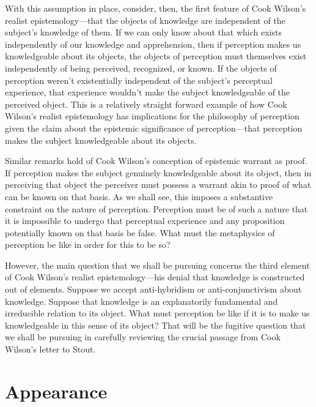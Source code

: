 \documentclass[12pt]{article}
\begin{document}
With this assumption in place, consider, then, the first feature of Cook Wilson's realist epistemology---that the objects of knowledge are independent of the subject's knowledge of them. If we can only know about that which exists independently of our knowledge and apprehension, then if perception makes us knowledgeable about its objects, the objects of perception must themselves exist independently of being perceived, recognized, or known. If the objects of perception weren't existentially independent of the subject's perceptual experience, that experience wouldn't make the subject knowledgeable of the perceived object. This is a relatively straight forward example of how Cook Wilson's realist epistemology has implications for the philosophy of perception given the claim about the epistemic significance of perception---that perception makes the subject knowledgeable about its objects.

Similar remarks hold of Cook Wilson's conception of epistemic warrant as proof. If perception makes the subject genuinely knowledgeable about its object, then in perceiving that object the perceiver must possess a warrant akin to proof of what can be known on that basis. As we shall see, this imposes a substantive constraint on the nature of perception. Perception must be of such a nature that it is impossible to undergo that perceptual experience and any proposition potentially known on that basis be false. What must the metaphysics of perception be like in order for this to be so?

However, the main question that we shall be pursuing concerns the third element of Cook Wilson's realist epistemology---his denial that knowledge is constructed out of elements. Suppose we accept anti-hybridism or anti-conjunctivism about knowledge. Suppose that knowledge is an explanatorily fundamental and irreducible relation to its object. What must perception be like if it is to make us knowledgeable in this sense of its object? That will be the fugitive question that we shall be pursuing in carefully reviewing the crucial passage from Cook Wilson's letter to Stout.



\section{Appearance} %
\label{sec:appearance}
\end{document}
